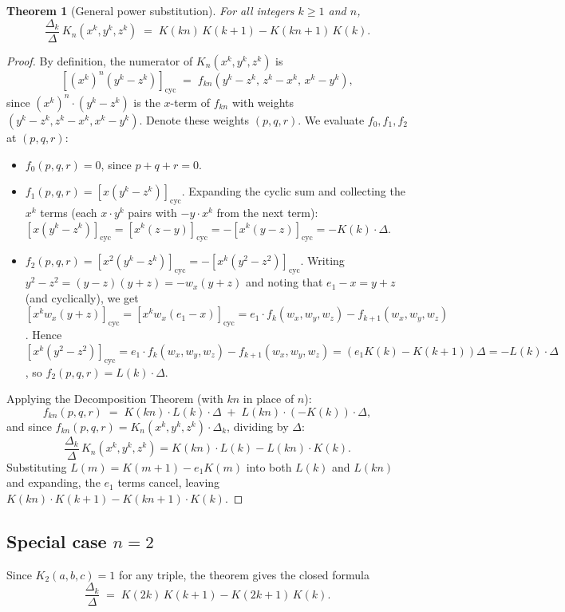 \documentclass[12pt]{article}
\newtheorem{theorem}{Theorem}[section]
\theoremstyle{definition}
\newcommand{\cyc}[1]{\left[#1\right]_{\!\mathrm{cyc}}}
\begin{document}
	\begin{theorem}[General power substitution]
		\label{thm:power}
		For all integers $k \geq 1$ and $n$,
		\[
		\frac{\Delta_k}{\Delta}\, K_n(x^k,y^k,z^k)
		\;=\;
		K(kn)\,K(k+1) - K(kn+1)\,K(k).
		\]
	\end{theorem}
	\begin{proof}
		By definition, the numerator of $K_n(x^k,y^k,z^k)$ is
		\[
		\cyc{(x^k)^n(y^k-z^k)} \;=\; f_{kn}(y^k-z^k,\, z^k-x^k,\, x^k-y^k),
		\]
		since $(x^k)^n \cdot (y^k - z^k)$ is the $x$-term of $f_{kn}$ with weights
		$(y^k-z^k, z^k-x^k, x^k-y^k)$.  Denote these weights $(p,q,r)$.
		We evaluate $f_0, f_1, f_2$ at $(p,q,r)$:
		\begin{itemize}
			\item $f_0(p,q,r) = 0$, since $p+q+r = 0$.
			\item $f_1(p,q,r) = \cyc{x(y^k-z^k)}$.  Expanding the cyclic sum
			and collecting the $x^k$ terms (each $x \cdot y^k$ pairs with
			$-y \cdot x^k$ from the next term):
			$\cyc{x(y^k-z^k)} = \cyc{x^k(z-y)} = -\cyc{x^k(y-z)} = -K(k) \cdot \Delta$.
			\item $f_2(p,q,r) = \cyc{x^2(y^k-z^k)} = -\cyc{x^k(y^2-z^2)}$.
			Writing $y^2-z^2 = (y-z)(y+z) = -w_x(y+z)$ and noting that $e_1 - x = y+z$ (and cyclically), we get
			$\cyc{x^k w_x(y+z)} = \cyc{x^k w_x(e_1-x)} = e_1 \cdot f_k(w_x,w_y,w_z) - f_{k+1}(w_x,w_y,w_z)$.
			Hence $\cyc{x^k(y^2-z^2)} = e_1 \cdot f_k(w_x,w_y,w_z) - f_{k+1}(w_x,w_y,w_z)
			= (e_1 K(k) - K(k+1))\Delta = -L(k) \cdot \Delta$,
			so $f_2(p,q,r) = L(k) \cdot \Delta$.
		\end{itemize}
		Applying the Decomposition Theorem (with $kn$ in place of $n$):
		\[
		f_{kn}(p,q,r) \;=\; K(kn) \cdot L(k) \cdot \Delta \;+\; L(kn) \cdot (-K(k)) \cdot \Delta,
		\]
		and since $f_{kn}(p,q,r) = K_n(x^k,y^k,z^k)\cdot\Delta_k$, dividing by $\Delta$:
		\[
		\frac{\Delta_k}{\Delta}\,K_n(x^k,y^k,z^k) = K(kn) \cdot L(k) - L(kn) \cdot K(k).
		\]
		Substituting $L(m) = K(m+1) - e_1 K(m)$ into both $L(k)$ and $L(kn)$ and
		expanding, the $e_1$ terms cancel, leaving $K(kn) \cdot K(k+1) - K(kn+1) \cdot K(k)$.
	\end{proof}
	
	\subsection*{Special case $n=2$}
	
	Since $K_2(a,b,c) = 1$ for any triple, the theorem gives the closed formula
	\[
	\frac{\Delta_k}{\Delta}
	\;=\;
	K(2k)\,K(k+1) - K(2k+1)\,K(k).
	\]
	
\end{document}
